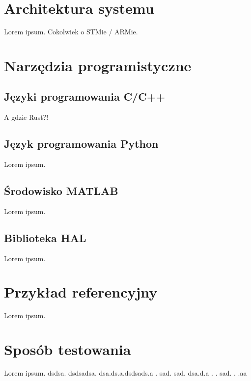 \section{Architektura systemu} \label{sec:system}
Lorem ipsum. Cokolwiek o STMie / ARMie.

\section{Narzędzia programistyczne} \label{sec:prog}

\subsection{Języki programowania C/C++} \label{sec:cpp}
A gdzie Rust?!

\subsection{Język programowania Python} \label{sec:python}
Lorem ipsum.

\subsection{Środowisko MATLAB} \label{sec:matlab}
Lorem ipsum.

\subsection{Biblioteka HAL} \label{sec:hal}
Lorem ipsum.

\section{Przykład referencyjny} \label{sec:ref}
Lorem ipsum.

\section{Sposób testowania} \label{sec:tests}
Lorem ipsum. \newline
dsdsa. \newline
dsdsadsa. \newline
dsa.ds.a.dsdsads.a \newline
. \newline
sad. \newline
sad. \newline
dsa.d.a \newline
. \newline \newline
. \newline
sad. \newline
. \newline
.aa \newline
